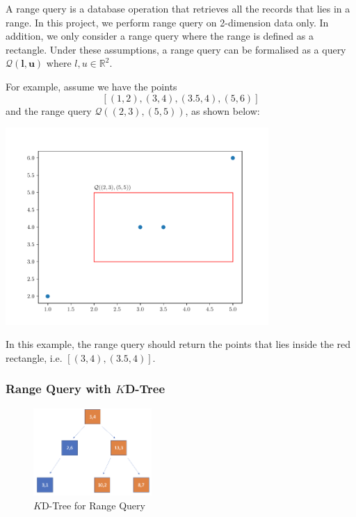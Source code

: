 A range query is a database operation that retrieves all the records that lies in a range. In this project, we perform range query on 2-dimension data only. In addition, we only consider a range query where the range is defined as a rectangle. Under these assumptions, a range query can be formalised as a query $\mathcal{Q}(\boldsymbol{l}, \boldsymbol{u})$ where $l,u\in\mathbb{R}^2$.

\begin{mscexample}
	For example, assume we have the points
	$$
	[(1,2), (3,4), (3.5, 4), (5,6)]
	$$
	and the range query $\mathcal{Q}((2,3), (5,5))$, as shown below:
	
	\begin{minipage}[t]{\linewidth}
	\centering
   	\includegraphics[width=10cm]{graphs/implementation/queries/range_query.pdf}
   	\label{fig:range_query_demo}
	\end{minipage}
	
In this example, the range query should return the points that lies inside the red rectangle, i.e. $[(3,4), (3.5, 4)]$.

\end{mscexample}

\subsubsection{Range Query with $K$D-Tree}

\begin{figure}[htp]
    \centering
    \includegraphics[width=0.4\textwidth]{graphs/Range_Query_Tree.png}
    \caption{$K$D-Tree for Range Query}
    \label{fig:KD-Tree_for_Range Query}
\end{figure}

